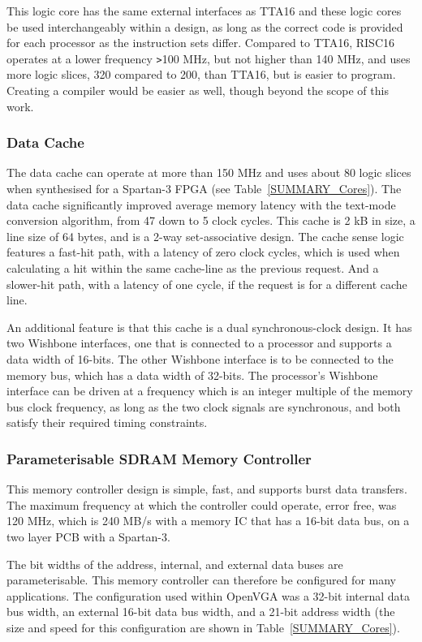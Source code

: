 This logic core has the same external interfaces as TTA16 and these logic cores
be used interchangeably within a design, as long as the correct code is provided
for each processor as the instruction sets differ. Compared to TTA16, RISC16
operates at a lower frequency \texttt{>}100 MHz, but not higher than 140 MHz, and
uses more logic slices, 320 compared to 200, than TTA16, but is easier to
program. Creating a compiler would be easier as well, though beyond the scope of
this work.


\subsubsection{Data Cache}
The data cache can operate at more than 150 MHz and uses about 80 logic slices
when synthesised for a Spartan-3 FPGA (see Table~\ref{SUMMARY_Cores}). The data
cache significantly improved average memory latency with the text-mode conversion
algorithm, from 47 down to 5 clock cycles. This cache is 2 kB in size, a line
size of 64 bytes, and is a 2-way set-associative design. The cache sense logic
features a fast-hit path, with a latency of zero clock cycles, which is used when
calculating a hit within the same cache-line as the previous request. And a
slower-hit path, with a latency of one cycle, if the request is for a different
cache line.

An additional feature is that this cache is a dual synchronous-clock design. It
has two Wishbone interfaces, one that is connected to a processor and supports a
data width of 16-bits. The other Wishbone interface is to be connected to the
memory bus, which has a data width of 32-bits. The processor's Wishbone interface
can be driven at a frequency which is an integer multiple of the memory bus clock
frequency, as long as the two clock signals are synchronous, and both satisfy
their required timing constraints.


\subsubsection{Parameterisable SDRAM Memory Controller}
This memory controller design is simple, fast, and supports burst data transfers.
The maximum frequency at which the controller could operate, error free, was 120
MHz, which is 240 MB/s with a memory IC that has a 16-bit data bus, on a two
layer PCB with a Spartan-3.

The bit widths of the address, internal, and external data buses are
parameterisable. This memory controller can therefore be configured for many
applications. The configuration used within OpenVGA was a 32-bit internal data
bus width, an external 16-bit data bus width, and a 21-bit address width (the
size and speed for this configuration are shown in Table~\ref{SUMMARY_Cores}).

